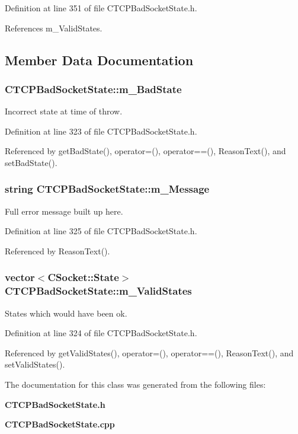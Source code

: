Definition at line 351 of file CTCPBad\-Socket\-State.h.

References m\_\-Valid\-States.

\subsection{Member Data Documentation}
\subsubsection{ CTCPBad\-Socket\-State::m\_\-Bad\-State\hspace{0.3cm}{\tt  [private]}}\label{classCTCPBadSocketState_o0}


Incorrect state at time of throw.



Definition at line 323 of file CTCPBad\-Socket\-State.h.

Referenced by get\-Bad\-State(), operator=(), operator==(), Reason\-Text(), and set\-Bad\-State().
\subsubsection{\setlength{\rightskip}{0pt plus 5cm}string CTCPBad\-Socket\-State::m\_\-Message\hspace{0.3cm}{\tt  [private]}}\label{classCTCPBadSocketState_o2}


Full error message built up here.



Definition at line 325 of file CTCPBad\-Socket\-State.h.

Referenced by Reason\-Text().
\subsubsection{\setlength{\rightskip}{0pt plus 5cm}vector$<${\bf CSocket::State}$>$ CTCPBad\-Socket\-State::m\_\-Valid\-States\hspace{0.3cm}{\tt  [private]}}\label{classCTCPBadSocketState_o1}


States which would have been ok.



Definition at line 324 of file CTCPBad\-Socket\-State.h.

Referenced by get\-Valid\-States(), operator=(), operator==(), Reason\-Text(), and set\-Valid\-States().

The documentation for this class was generated from the following files:\begin{CompactItemize}
\item 
{\bf CTCPBad\-Socket\-State.h}\item 
{\bf CTCPBad\-Socket\-State.cpp}\end{CompactItemize}
